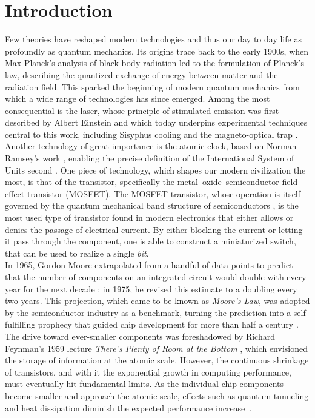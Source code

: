 \chapter{Introduction}

Few theories have reshaped modern technologies and thus our day to day life as profoundly as quantum mechanics. Its origins trace back to the early 1900s, when Max Planck's analysis of black body radiation led to the formulation of Planck's law, describing the quantized exchange of energy between matter and the radiation field. This sparked the beginning of modern quantum mechanics from which a wide range of technologies has since emerged. Among the most consequential is the laser, whose principle of stimulated emission was first described by Albert Einstein \cite{EinsteinLaser} and which today underpins experimental techniques central to this work, including Sisyphus cooling \cite{SysiphusCoolingWineland} and the magneto-optical trap \cite{MOTPaper}. Another technology of great importance is the atomic clock, based on Norman Ramsey's work \cite{RamseyNobelPrize}, enabling the precise definition of the International System of Units second \cite{RamseySecondDefinition}. One piece of technology, which shapes our modern civilization the most, is that of the transistor, specifically the metal–oxide–semiconductor field-effect transistor (MOSFET). The MOSFET transistor, whose operation is itself governed by the quantum mechanical band structure of semiconductors \cite{Hunklinger}, is the most used type of transistor found in modern electronics \cite{MOSFET} that either allows or denies the passage of electrical current. By either blocking the current or letting it pass through the component, one is able to construct a miniaturized switch, that can be used to realize a single \textit{bit}. \\

In 1965, Gordon Moore extrapolated from a handful of data points to predict that the number of components on an integrated circuit would double with every year for the next decade \cite{MooresLaw}; in 1975, he revised this estimate to a doubling every two years. This projection, which came to be known as \textit{Moore's Law}, was adopted by the semiconductor industry as a benchmark, turning the prediction into a self-fulfilling prophecy that guided chip development for more than half a century \cite{Mollick2006}. \\

The drive toward ever-smaller components was foreshadowed by Richard Feynman's 1959 lecture \textit{There's Plenty of Room at the Bottom} \cite{feynman1992plenty}, which envisioned the storage of information at the atomic scale. However, the continuous shrinkage of transistors, and with it the exponential growth in computing performance, must eventually hit fundamental limits. As the individual chip components become smaller and approach the atomic scale, effects such as quantum tunneling and heat dissipation diminish the expected performance increase~\cite{MooresLawBad}. \\

